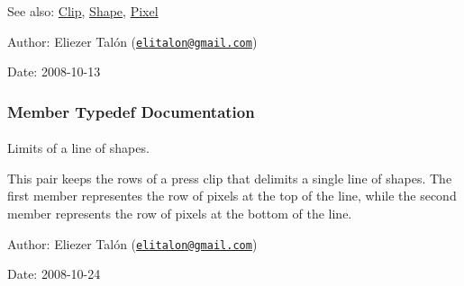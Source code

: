 \begin{Desc}
\item[See also:]\hyperlink{class_clip}{Clip}, \hyperlink{class_shape}{Shape}, \hyperlink{_shape_8hpp_535e59456e3e633842529cfa8ea103c4}{Pixel}\end{Desc}
\begin{Desc}
\item[Author:]Eliezer Talón (\href{mailto:elitalon@gmail.com}{\tt elitalon@gmail.com}) \end{Desc}
\begin{Desc}
\item[Date:]2008-10-13 \end{Desc}


\subsubsection{Member Typedef Documentation}
\hypertarget{class_segmenter_ae134abed2f1d55197820f4027d10999}{
\paragraph[{LineMarker}]{}\hfill}
\label{class_segmenter_ae134abed2f1d55197820f4027d10999}


Limits of a line of shapes. 

This pair keeps the rows of a press clip that delimits a single line of shapes. The first member representes the row of pixels at the top of the line, while the second member represents the row of pixels at the bottom of the line.

\begin{Desc}
\item[Author:]Eliezer Talón (\href{mailto:elitalon@gmail.com}{\tt elitalon@gmail.com}) \end{Desc}
\begin{Desc}
\item[Date:]2008-10-24 \end{Desc}
\hypertarget{class_segmenter_b3190459e52101e495e49e936bbb6440}{
\paragraph[{LineMarkerIterator}]{}\hfill}
\label{class_segmenter_b3190459e52101e495e49e936bbb6440}



